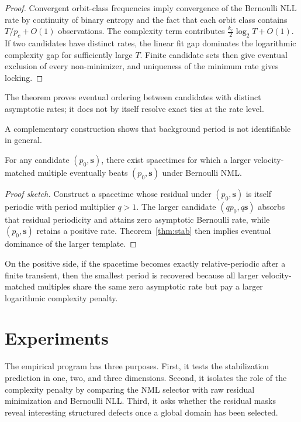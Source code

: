 \documentclass[10pt,twoside]{article}
\newcommand{\bs}{\mathbf{s}}
\begin{document}
\begin{proof}
Convergent orbit-class frequencies imply convergence of the Bernoulli NLL rate by continuity of binary entropy and the fact that each orbit class contains $T/p_c+O(1)$ observations. The complexity term contributes $\frac{k_c}{2}\log_2 T+O(1)$. If two candidates have distinct rates, the linear fit gap dominates the logarithmic complexity gap for sufficiently large $T$. Finite candidate sets then give eventual exclusion of every non-minimizer, and uniqueness of the minimum rate gives locking.
\end{proof}

The theorem proves eventual ordering between candidates with distinct asymptotic rates; it does not by itself resolve exact ties at the rate level.

A complementary construction shows that background period is not identifiable in general.

\begin{theorem}\label{thm:nonid}
For any candidate $(p_0,\bs)$, there exist spacetimes for which a larger velocity-matched multiple eventually beats $(p_0,\bs)$ under Bernoulli NML.
\end{theorem}

\begin{proof}[Proof sketch]
Construct a spacetime whose residual under $(p_0,\bs)$ is itself periodic with period multiplier $q>1$. The larger candidate $(qp_0,q\bs)$ absorbs that residual periodicity and attains zero asymptotic Bernoulli rate, while $(p_0,\bs)$ retains a positive rate. Theorem~\ref{thm:stab} then implies eventual dominance of the larger template.
\end{proof}

On the positive side, if the spacetime becomes exactly relative-periodic after a finite transient, then the smallest period is recovered because all larger velocity-matched multiples share the same zero asymptotic rate but pay a larger logarithmic complexity penalty.

\section{Experiments}

The empirical program has three purposes. First, it tests the stabilization prediction in one, two, and three dimensions. Second, it isolates the role of the complexity penalty by comparing the NML selector with raw residual minimization and Bernoulli NLL. Third, it asks whether the residual masks reveal interesting structured defects once a global domain has been selected.
\end{document}
